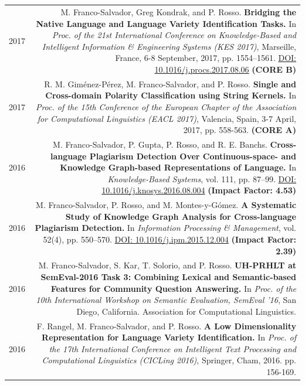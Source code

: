 \documentclass[10pt]{article}
\begin{document}
\section*{}
\begin{tabular}{L!{\VRule}R}	
	2017&M. Franco-Salvador, Greg Kondrak, and P. Rosso. \textbf{Bridging the Native Language and Language Variety Identification Tasks.}
	In \emph{Proc. of the 21st International Conference on Knowledge-Based and Intelligent Information \& Engineering Systems (KES 2017)}, Marseille, France, 6-8 September, 2017, pp. 1554--1561. \href{https://doi.org/10.1016/j.procs.2017.08.068}{DOI: 10.1016/j.procs.2017.08.06} \textbf{(CORE B)}\vspace{5pt}\\
	2017&R. M. Gim{\'e}nez-P{\'e}rez, M. Franco-Salvador, and P. Rosso. \textbf{Single and Cross-domain Polarity Classification using String Kernels.}
	In \emph{Proc. of the 15th Conference of the European Chapter of the Association for Computational Linguistics (EACL 2017)}, Valencia, Spain, 3-7 April, 2017, pp. 558-563. \textbf{(CORE A)}\vspace{5pt}\\
	2016&M. Franco-Salvador, P. Gupta, P. Rosso, and R. E. Banchs. \textbf{Cross-language Plagiarism Detection Over Continuous-space- and Knowledge Graph-based Representations of Language.}
	In \emph{Knowledge-Based Systems}, vol. 111, pp. 87--99. \href{http://dx.doi.org/10.1016/j.knosys.2016.08.004}{DOI: 10.1016/j.knosys.2016.08.004} \textbf{(Impact Factor: 4.53)} \vspace{5pt}\\
	2016&M. Franco-Salvador, P. Rosso, and M. Montes-y-G{\'o}mez. \textbf{A Systematic Study of Knowledge Graph Analysis for Cross-language Plagiarism Detection.}
	In \emph{Information Processing \& Management}, vol. 52(4), pp. 550--570. \href{http://dx.doi.org/10.1016/j.ipm.2015.12.004}{DOI: 10.1016/j.ipm.2015.12.004} \textbf{(Impact Factor: 2.39)} \vspace{5pt}\\
	2016 &M. Franco-Salvador, S. Kar, T. Solorio, and P. Rosso. \textbf{UH-PRHLT at SemEval-2016 Task 3: Combining Lexical and Semantic-based Features for Community Question Answering.} In \emph{Proc. of the 10th International Workshop on Semantic Evaluation, SemEval '16}, San Diego, California. Association for Computational Linguistics. \vspace{5pt}\\
	2016 &F. Rangel, M. Franco-Salvador, and P. Rosso. \textbf{A Low Dimensionality Representation for Language Variety Identification.} In \emph{Proc.  of  the  17th  International Conference on Intelligent Text Processing and Computational Linguistics (CICLing 2016)}, Springer, Cham, 2016. pp. 156-169. \vspace{5pt}\\

\end{tabular}
\end{document}
